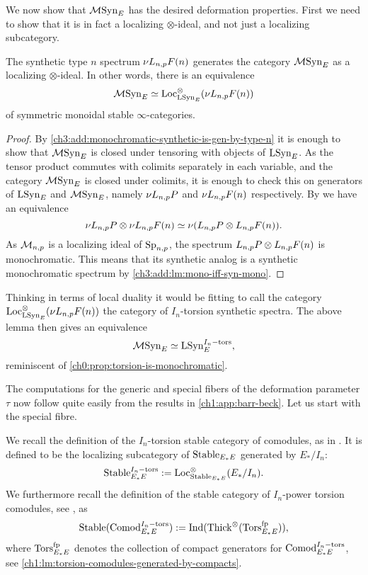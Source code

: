 We now show that $\mathcal{M}\mathrm{Syn}_{E}$ has the desired deformation properties. First we need to show that it is in fact a localizing $\otimes$-ideal, and not just a localizing subcategory. 

\begin{lemma}
    The synthetic type $n$ spectrum $\nu L_{n,p} F(n)$ generates the category $\mathcal{M}\mathrm{Syn}_{E}$ as a localizing $\otimes$-ideal. In other words, there is an equivalence 
    \[\mathcal{M}\mathrm{Syn}_{E} \simeq \operatorname{Loc}_{\mathrm{LSyn}_{E}}^\otimes(\nu L_{n,p} F(n))\] 
    of symmetric monoidal stable $\infty$-categories. 
\end{lemma}
\begin{proof}
    By \cref{ch3:add:monochromatic-synthetic-is-gen-by-type-n} it is enough to show that $\mathcal{M}\mathrm{Syn}_{E}$ is closed under tensoring with objects of $\mathrm{LSyn}_{E}$. As the tensor product commutes with colimits separately in each variable, and the category $\mathcal{M}\mathrm{Syn}_{E}$ is closed under colimits, it is enough to check this on generators of $\mathrm{LSyn}_{E}$ and $\mathcal{M}\mathrm{Syn}_{E}$, namely $\nu L_{n,p} P$ and $\nu L_{n,p} F(n)$ respectively. By \cite[4.24]{pstragowski_2022} we have an equivalence 
    \[\nu L_{n,p} P \otimes \nu L_{n,p} F(n) \simeq \nu(L_{n,p} P \otimes L_{n,p} F(n)).\]
    As $\mathcal{M}_{n,p}$ is a localizing ideal of $\mathrm{Sp}_{n,p}$, the spectrum $L_{n,p} P \otimes L_{n,p} F(n)$ is monochromatic. This means that its synthetic analog is a synthetic monochromatic spectrum by \cref{ch3:add:lm:mono-iff-syn-mono}. 
\end{proof}

\begin{remark}
    Thinking in terms of local duality it would be fitting to call the category $\operatorname{Loc}^\otimes_{\mathrm{LSyn}_{E}}(\nu L_{n,p} F(n))$ the category of $I_n$-torsion synthetic spectra. The above lemma then gives an equivalence 
    \[\mathcal{M}\mathrm{Syn}_{E} \simeq \mathrm{LSyn}_{E}^{I_n-\mathrm{tors}},\]
    reminiscent of \cref{ch0:prop:torsion-is-monochromatic}. 
\end{remark}

The computations for the generic and special fibers of the deformation parameter $\tau$ now follow quite easily from the results in \cref{ch1:app:barr-beck}. Let us start with the special fibre. 

We recall the definition of the $I_n$-torsion stable category of comodules, as in \cite[2.4]{barthel-heard-valenzuela_2020}. It is defined to be the localizing subcategory of $\mathrm{Stable}_{E_*E}$ generated by $E_{*}/I_n$:
\[\mathrm{Stable}_{E_*E}^{I_n-\mathrm{tors}} := \operatorname{Loc}_{\mathrm{Stable}_{E_*E}}^\otimes(E_{*}/I_n).\] 
We furthermore recall the definition of the stable category of $I_n$-power torsion comodules, see \cite[3.5]{barthel-heard-valenzuela_2020}, as 
\[\mathrm{Stable}(\mathrm{Comod}_{E_*E}^{I_n-\mathrm{tors}}) := \operatorname{Ind}(\operatorname{Thick}^\otimes(\mathrm{Tors}_{E_*E}^{\mathrm{fp}})),\]
where $\mathrm{Tors}_{E_*E}^{\mathrm{fp}}$ denotes the collection of compact generators for $\mathrm{Comod}_{E_*E}^{I_n-\mathrm{tors}}$, see \cref{ch1:lm:torsion-comodules-generated-by-compacts}. 

